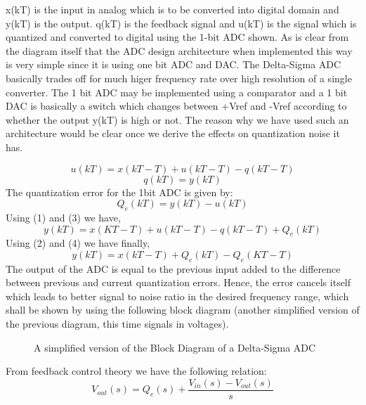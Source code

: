 \documentclass[colorlinks=true,pdfstartview=FitV,linkcolor=blue,
            citecolor=red,urlcolor=magenta]{ligodoc}
\begin{document}
x(kT) is the input in analog which is to be converted into digital domain and y(kT) is the output. q(kT) is the feedback signal and u(kT) is the signal which is quantized and converted to digital using the 1-bit ADC shown.
As is clear from the diagram itself that the ADC design architecture when implemented this way is very simple since it is using one bit ADC and DAC. The Delta-Sigma ADC basically trades off for much higer frequency rate over high resolution of a single converter. The 1 bit ADC may be implemented using a comparator and a 1 bit DAC is basically a switch which changes between +Vref and -Vref according to whether the output y(kT) is high or not. The reason why we have used such an architecture would be clear once we derive the effects on quantization noise it has.

\begin{equation}
u(kT)=x(kT-T)+u(kT-T)-q(kT-T)
\end{equation}
\begin{equation}
q(kT)=y(kT)
\end{equation}
The quantization error for the 1bit ADC is given by:
\begin{equation}
Q_{e}(kT)=y(kT)-u(kT)
\end{equation}
Using (1) and (3) we have,
\begin{equation}
y(kT)=x(KT-T)+u(kT-T)-q(kT-T)+Q_{e}(kT)
\end{equation}
Using (2) and (4) we have finally,
\begin{equation}
y(kT)=x(kT-T)+Q_{e}(kT)-Q_{e}(KT-T)
\end{equation}
The output of the ADC is equal to the previous input added to the difference between previous and current quantization errors. Hence, the error cancels itself which leads to better signal to noise ratio in the desired frequency range, which shall be shown by using the following block diagram (another simplified version of the previous diagram, this time signals in voltages).
\begin{figure}[htbp]
 
  \centering
  
  \caption{A simplified version of the Block Diagram of a Delta-Sigma ADC}
 
\end{figure}
From feedback control theory we have the following relation:
\begin{equation}
V_{out}(s)=Q_{e}(s)+\frac{V_{in}(s)-V_{out}(s)}{s}
\end{equation}
\end{document}
